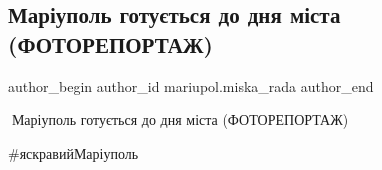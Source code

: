  
 
 
 
 

\subsection{Маріуполь готується до дня міста (ФОТОРЕПОРТАЖ)}
\label{sec:24_09_2020.fb.mariupol.miska_rada.1.preparations_den_mista_fotoreportazh}

\ifcmt
 author_begin
   author_id mariupol.miska_rada
 author_end
\fi

🤩Маріуполь готується до дня міста (ФОТОРЕПОРТАЖ)

\#яскравийМаріуполь
